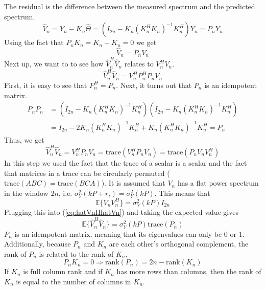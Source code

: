The residual is the difference between the measured spectrum and the predicted spectrum.
\begin{equation*}
    \hat{V}_n = Y_n - K_n \hat\Theta = (I_{2n}-K_n(K_n^H K_n)^{-1}K_n^H) Y_n = P_n Y_n
\end{equation*}
Using the fact that $P_n K_n = K_n - K_n = 0$ we get
\begin{equation*}
    \hat{V}_n = P_n V_n
\end{equation*}
Next up, we want to to see how $\hat V_n^H \hat V_n$ relates to $V_n^H V_n$.
\begin{equation*}
    \hat V_n^H \hat V_n = V_n^H P_n^H P_n V_n
\end{equation*}
First, it is easy to see that $P_n^H = P_n$. Next, it turns out that $P_n$ is an idempotent matrix.
\begin{align*}
    P_n P_n &= (I_{2n}-K_n(K_n^H K_n)^{-1}K_n^H)(I_{2n}-K_n(K_n^H K_n)^{-1}K_n^H) \\
    &= I_{2n} - 2 K_n(K_n^H K_n)^{-1}K_n^H + K_n(K_n^H K_n)^{-1}K_n^H = P_n
\end{align*}
Thus, we get
\begin{equation}
    \hat V_n^H \hat V_n = V_n^H P_n V_n = \text{trace}(V_n^H P_n V_n) = \text{trace}(P_n V_n V_n^H)
    \label{eq:hatVnHhatVn}
\end{equation}
In this step we used the fact that the trace of a scalar is a scalar and the fact that matrices in a trace can be circularly permuted ($\text{trace}(A B C) = \text{trace}(B C A)$).
It is assumed that $V_n$ has a flat power spectrum in the window $2n$, i.e. $\sigma_Y^2(kP+r_i) = \sigma_Y^2(kP)$. This means that
\begin{equation*}
    \mathbb{E}\{V_n V_n^H\} = \sigma_Y^2(kP) I_{2n}
\end{equation*}
Plugging this into (\ref{eq:hatVnHhatVn}) and taking the expected value gives
\begin{equation}
    \mathbb{E}\{\hat V_n^H \hat V_n\} = \sigma_Y^2(kP)\text{trace}(P_n)
\end{equation}
$P_n$ is an idempotent matrix, meaning that its eigenvalues can only be 0 or 1. Additionally, because $P_n$ and $K_n$ are each other's orthogonal complement, the rank of $P_n$ is related to the rank of $K_n$. 
\begin{equation*}
    P_n K_n  = 0 \Rightarrow \text{rank}(P_n) = 2n - \text{rank}(K_n)
\end{equation*}
If $K_n$ is full column rank and if $K_n$ has more rows than columns, then the rank of $K_n$ is equal to the number of columns in $K_n$.
